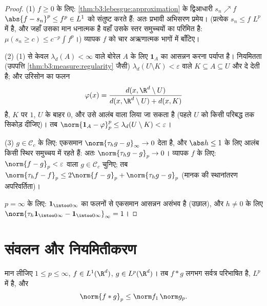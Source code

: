 \begin{proof}
(1) $f \geq 0$ के लिए: \cref{thm:b3:lebesgue:approximation} के द्विआधारी $s_n \nearrow f$ $\abs{f - s_n}^p
\leq f^p \in L^1$ को संतुष्ट करते
हैं: अतः प्रभावी अभिसरण प्रमेय। (प्रत्येक $s_n \leq f$ $L^p$ में है, और
जहाँ उसका मान धनात्मक है वहाँ उसके स्तर समुच्चयों का  परिमित
है: $\mu(s_n \geq c) \leq c^{-p}\int f^p$।) व्यापक $f$ को चार अऋणात्मक भागों में बाँटिए।

(2) (1) से केवल $\lambda_d(A) < \infty$ वाले बोरेल $A$ के लिए $\mathbf 1_A$ का आसन्नन करना
पर्याप्त है। नियमितता (उपपत्ति \cref{thm:b3:measure:regularity} जैसी) $\lambda_d(U\setminus K) <
\varepsilon$ वाले  $K \subseteq A
\subseteq U$
और  दे देती है; और उरिसोन का फलन
\[
\varphi(x) = \frac{d(x, \R^d\setminus U)}{d(x, \R^d\setminus U)
+ d(x, K)}
\]
 है, $K$ पर $1$, $U$ के बाहर $0$, और उसे  आलंब
वाला लिया जा सकता है (पहले $U$ को किसी परिबद्ध  तक
सिकोड़ दीजिए)। तब $\norm{\mathbf 1_A - \varphi}_p^p \leq \lambda_d(U\setminus K)
< \varepsilon$।

(3) $g \in \mathcal C_c$ के लिए: एकसमान  $\norm{\tau_hg - g}_\infty \to 0$ देता है, और $\abs h \leq 1$ के लिए
आलंब किसी स्थिर  समुच्चय में रहते हैं: अतः $\norm{\tau_hg - g}_p \to 0$। व्यापक $f$
के लिए: $\norm{f - g}_p <
\varepsilon$ वाला $g \in \mathcal C_c$ चुनिए; तब $\norm{\tau_hf - f}_p \leq 2\norm{f - g}_p +
\norm{\tau_hg - g}_p$ (मानक की स्थानांतरण
अपरिवर्तिता)।

$p = \infty$ के लिए: $\mathbf
1_{\intoo0\infty}$ का  फलनों से एकसमान आसन्नन असंभव है
(उछाल), और $h \neq 0$ के लिए $\norm{\tau_h\mathbf 1_{\intoo0\infty} - \mathbf
1_{\intoo0\infty}}_\infty = 1$।
\end{proof}

\section{संवलन और नियमितीकरण}

\begin{theorem}[यंग की असमिका]\label{thm:b3:lp:young}
मान लीजिए $1 \leq p \leq \infty$, $f \in L^1(\R^d)$, $g \in
L^p(\R^d)$। तब $f * g$ लगभग सर्वत्र परिभाषित है,
$L^p$ में है, और
\[
\norm{f * g}_p \leq \norm f_1\,\norm g_p .
\]
\end{theorem}

